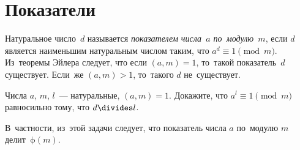 
\section*{Показатели}


Натуральное число~$d$ называется \emph{показателем числа~$a$ по~модулю~$m$},
если $d$ является наименьшим натуральным числом таким, что
$a^d \equiv 1 \pmod{m}$.
Из~теоремы Эйлера следует, что если $(a, m) = 1$, то~такой показатель~$d$
существует.
Если~же $(a, m) > 1$, то~такого $d$ не~существует.

\begin{problems}

\item
Числа $a$, $m$, $l$~— натуральные, $(a, m) = 1$.
Докажите, что $a^l \equiv 1 \pmod{m}$ равносильно тому, что $d \divides l$.

\end{problems}

В~частности, из~этой задачи следует, что показатель числа $a$ по~модулю $m$
делит~$\mathrm{\phi}(m)$.

